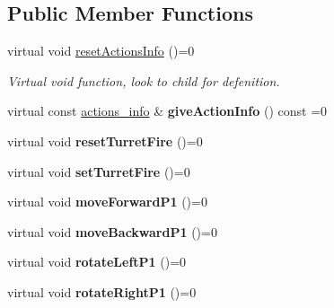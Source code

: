 \subsection*{Public Member Functions}
\begin{DoxyCompactItemize}
\item 
\hypertarget{class_action_data_aede7cfa65182cda2a2d43df11ccf2183}{virtual void \hyperlink{class_action_data_aede7cfa65182cda2a2d43df11ccf2183}{reset\+Actions\+Info} ()=0}\label{class_action_data_aede7cfa65182cda2a2d43df11ccf2183}

\begin{DoxyCompactList}\small\item\em Virtual void function, look to child for defenition. \end{DoxyCompactList}\item 
\hypertarget{class_action_data_ab2f5b210968c91a01ed1439904b3ffee}{virtual const \hyperlink{structactions__info}{actions\+\_\+info} \& {\bfseries give\+Action\+Info} () const =0}\label{class_action_data_ab2f5b210968c91a01ed1439904b3ffee}

\item 
\hypertarget{class_action_data_a043baaefa338dd8027ee3eec10f47e44}{virtual void {\bfseries reset\+Turret\+Fire} ()=0}\label{class_action_data_a043baaefa338dd8027ee3eec10f47e44}

\item 
\hypertarget{class_action_data_a30502665240f4a0b0e37fbcd6447b590}{virtual void {\bfseries set\+Turret\+Fire} ()=0}\label{class_action_data_a30502665240f4a0b0e37fbcd6447b590}

\item 
\hypertarget{class_action_data_a002859569085e9868adb7beabd3a2ad8}{virtual void {\bfseries move\+Forward\+P1} ()=0}\label{class_action_data_a002859569085e9868adb7beabd3a2ad8}

\item 
\hypertarget{class_action_data_a711265f479e845086896c42d1e906c57}{virtual void {\bfseries move\+Backward\+P1} ()=0}\label{class_action_data_a711265f479e845086896c42d1e906c57}

\item 
\hypertarget{class_action_data_acca33ba2c7ea6df807d7e7b787733178}{virtual void {\bfseries rotate\+Left\+P1} ()=0}\label{class_action_data_acca33ba2c7ea6df807d7e7b787733178}

\item 
\hypertarget{class_action_data_af780bdc2145493cb28b7f9dbee238328}{virtual void {\bfseries rotate\+Right\+P1} ()=0}\label{class_action_data_af780bdc2145493cb28b7f9dbee238328}


\end{DoxyCompactItemize}
